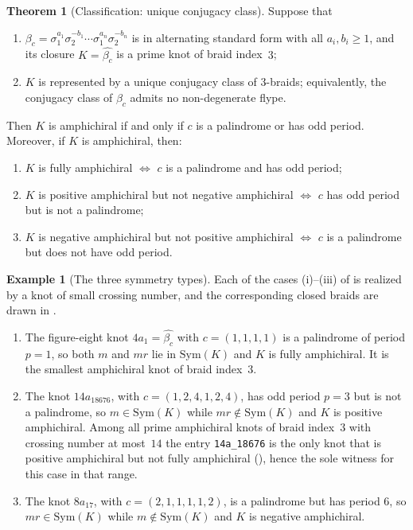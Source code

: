 \documentclass[11pt]{article}
\theoremstyle{definition}
\newtheorem{theorem}{Theorem}[section]
\newtheorem{example}[example]{Example}
\begin{document}
\begin{theorem}[Classification: unique conjugacy class]\label{thm:unique-amphi}
Suppose that
\begin{enumerate}[label=\textup{(\alph*)}]
\item
$\beta_c=
\sigma_{1}^{a_1}\sigma_{2}^{-b_1}\cdots
\sigma_{1}^{a_n}\sigma_{2}^{-b_n}$
is in alternating standard form with all $a_i,b_i\ge1$, and its
closure $K=\widehat{\beta_c}$ is a prime knot of braid index~$3$;
\item $K$ is represented by a unique conjugacy class of $3$-braids; equivalently,
the conjugacy class of $\beta_c$ admits no non-degenerate flype.
\end{enumerate}
Then $K$ is amphichiral if and only if $c$ is a palindrome or has odd period.
Moreover, if $K$ is amphichiral, then:
\begin{enumerate}[label=\textup{(\roman*)}]
  \item $K$ is fully amphichiral $\iff$ $c$ is a palindrome and has odd period;
  \item $K$ is positive amphichiral but not negative amphichiral $\iff$ $c$ has odd period but is not a palindrome;
  \item $K$ is negative amphichiral but not positive amphichiral $\iff$ $c$ is a palindrome but does not have odd period.
\end{enumerate}
\end{theorem}

\begin{example}[The three symmetry types]\label{ex:three-types}
Each of the cases \textup{(i)}--\textup{(iii)} of  is
realized by a knot of small crossing number, and the corresponding closed braids
are drawn in .
\begin{enumerate}[label=\textup{(\roman*)}]
\item The figure-eight knot $4a_{1}=\widehat{\beta_c}$ with $c=(1,1,1,1)$ is a
palindrome of period $p=1$, so both $m$ and $mr$ lie in $\mathrm{Sym}(K)$ and $K$
is fully amphichiral. It is the smallest amphichiral knot of braid index~$3$.
\item The knot $14a_{18676}$, with $c=(1,2,4,1,2,4)$, has odd period $p=3$ but is
not a palindrome, so $m\in\mathrm{Sym}(K)$ while $mr\notin\mathrm{Sym}(K)$ and $K$
is positive amphichiral. Among all prime amphichiral knots of braid index~$3$ with
crossing number at most~$14$ the entry \texttt{14a\_18676} is the only knot that
is positive amphichiral but not fully amphichiral \textup{(}\textup{)}, hence the sole witness for this case in
that range.
\item The knot $8a_{17}$, with $c=(2,1,1,1,1,2)$, is a palindrome but has period
$6$, so $mr\in\mathrm{Sym}(K)$ while $m\notin\mathrm{Sym}(K)$ and $K$ is negative
amphichiral.
\end{enumerate}
\end{example}
\end{document}
